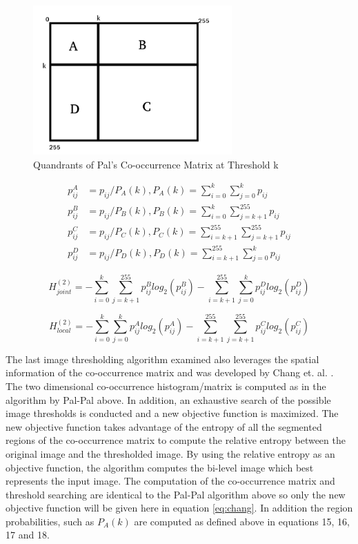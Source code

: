 \documentclass[journal]{IEEEtran}
\begin{document}
\begin{figure}
\centering
\includegraphics[width=3in]{./pal.png}
\caption{Quandrants of Pal's Co-occurrence Matrix at Threshold k}
\label{fig:pal}
\end{figure}

\begin{align}
p_{ij}^{A} &= p_{ij}/P_{A}(k), P_{A}(k) = \sum_{i=0}^k \sum_{j=0}^k p_{ij} \\
p_{ij}^{B} &= p_{ij}/P_{B}(k), P_{B}(k) = \sum_{i=0}^k \sum_{j=k+1}^{255} p_{ij} \\
p_{ij}^{C} &= p_{ij}/P_{C}(k), P_{C}(k) = \sum_{i=k+1}^{255} \sum_{j=k+1}^{255} p_{ij} \\
p_{ij}^{D} &= p_{ij}/P_{D}(k), P_{D}(k) = \sum_{i=k+1}^{255} \sum_{j=0}^{k} p_{ij}
\end{align}

\begin{equation}
\label{eq:pal_je}
H_{joint}^{(2)} = -\sum_{i=0}^{k} \sum_{j=k+1}^{255} p_{ij}^{B} log_2(p_{ij}^{B}) -
                   \sum_{i=k+1}^{255} \sum_{j=0}^{k} p_{ij}^{D} log_2(p_{ij}^{D})
\end{equation}

\begin{equation}
\label{eq:pal_le}
H_{local}^{(2)} = -\sum_{i=0}^{k} \sum_{j=0}^{k} p_{ij}^{A} log_2(p_{ij}^{A}) -
                   \sum_{i=k+1}^{255} \sum_{j=k+1}^{255} p_{ij}^{C} log_2(p_{ij}^{C})
\end{equation}

\par The last image thresholding algorithm examined also leverages the spatial information of the co-occurrence matrix and was developed by Chang et. al. \cite{chang}. The two dimensional co-occurrence histogram/matrix is computed as in the algorithm by Pal-Pal above. In addition, an exhaustive search of the possible image thresholds is conducted and a new objective function is maximized. The new objective function takes advantage of the entropy of all the segmented regions of the co-occurrence matrix to compute the relative entropy between the original image and the thresholded image. By using the relative entropy as an objective function, the algorithm computes the bi-level image which best represents the input image. The computation of the co-occurrence matrix and threshold searching are identical to the Pal-Pal algorithm above so only the new objective function will be given here in equation \ref{eq:chang}. In addition the region probabilities, such as \begin{math}P_A(k)\end{math} are computed as defined above in equations 15, 16, 17 and 18.
\end{document}
